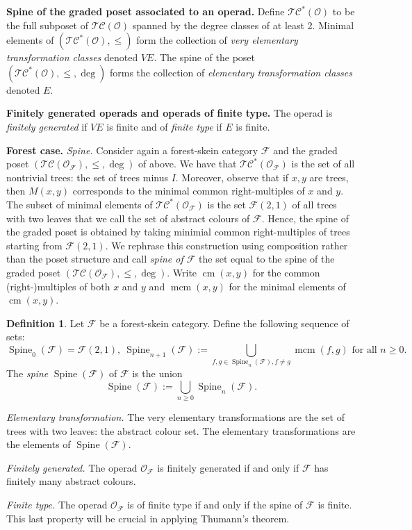 \documentclass[a4paper, 12pt]{amsart}
\numberwithin{equation}{section}
\theoremstyle{definition}
\newtheorem{definition}[theorem]{Definition}
\newcommand{\cC}{\mathcal C}
\DeclareMathOperator{\cm}{cm}
\newcommand{\cF}{\mathcal F}
\DeclareMathOperator{\mcm}{mcm}
\newcommand{\cO}{\mathcal O}
\DeclareMathOperator{\Sp}{Spine}
\newcommand{\cT}{\mathcal T}
\begin{document}
{\bf Spine of the graded poset associated to an operad.}
Define $\cT\cC^*(\cO)$ to be the full subposet of $\cT\cC(\cO)$ spanned by the degree classes of at least 2.
Minimal elements of $(\cT\cC^*(\cO),\leq)$ form the collection of {\it very elementary transformation classes} denoted $VE$. 
The spine of the poset $(\cT\cC^*(\cO), \leq,\deg)$ forms the collection of {\it elementary transformation classes} denoted $E$.

{\bf Finitely generated operads and operads of finite type.}
The operad is \textit{finitely generated} if $VE$ is finite and of \textit{finite type} if $E$ is finite.

{\bf Forest case.}
{\it Spine.} 
Consider again a forest-skein category $\cF$ and the graded poset $(\cT\cC(\cO_\cF),\leq,\deg)$ of above.
We have that $\cT\cC^*(\cO_\cF)$ is the set of all nontrivial trees: the set of trees minus $I$.
Moreover, observe that if $x,y$ are trees, then $M(x,y)$ corresponds to the minimal common right-multiples of $x$ and $y$.
The subset of minimal elements of $\cT\cC^*(\cO_\cF)$ is the set $\cF(2,1)$ of all trees with two leaves that we call the set of abstract colours of $\cF$. 
Hence, the spine of the graded poset is obtained by taking minimial common right-multiples of trees starting from $\cF(2,1)$.
%
We rephrase this construction using composition rather than the poset structure and call {\it spine of $\cF$} the set equal to the spine of the graded poset $(\cT\cC(\cO_\cF),\leq,\deg)$.
Write $\cm(x,y)$ for the common (right-)multiples of both $x$ and $y$ and $\mcm(x,y)$ for the minimal elements of $\cm(x,y)$.

\begin{definition}\label{def:spine}
Let $\cF$ be a forest-skein category.
Define the following sequence of sets:
$$\Sp_0(\cF) =\cF(2,1) ,\ \Sp_{n+1}(\cF) := \bigcup_{f,g\in \Sp_n(\cF), f\neq g}\mcm(f,g) \text{ for all } n\geq 0.$$
The \textit{spine} $\Sp(\cF)$ of $\cF$ is the union 
$$\Sp(\cF):=\bigcup_{n\geq 0} \Sp_n(\cF).$$
\end{definition}

{\it Elementary transformation.}
The very elementary transformations are the set of trees with two leaves: the abstract colour set.
The elementary transformations are the elements of $\Sp(\cF)$.

{\it Finitely generated.}
The operad $\cO_\cF$ is finitely generated if and only if $\cF$ has finitely many abstract colours.

{\it Finite type.}
The operad $\cO_\cF$ is of finite type if and only if the spine of $\cF$ is finite.
This last property will be crucial in applying Thumann's theorem.
\end{document}
